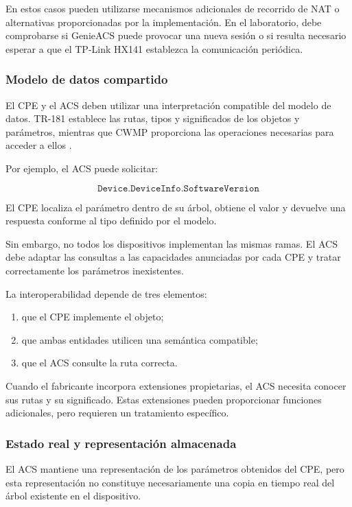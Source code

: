 En estos casos pueden utilizarse mecanismos adicionales de recorrido de
NAT o alternativas proporcionadas por la implementación. En el
laboratorio, debe comprobarse si GenieACS puede provocar una nueva sesión
o si resulta necesario esperar a que el TP-Link HX141 establezca la
comunicación periódica.


\subsubsection*{Modelo de datos compartido}

El CPE y el ACS deben utilizar una interpretación compatible del modelo
de datos. TR-181 establece las rutas, tipos y significados de los objetos
y parámetros, mientras que CWMP proporciona las operaciones necesarias
para acceder a ellos \cite{bbf_tr181}.

Por ejemplo, el ACS puede solicitar:

\[
    \texttt{Device.DeviceInfo.SoftwareVersion}
\]

El CPE localiza el parámetro dentro de su árbol, obtiene el valor y
devuelve una respuesta conforme al tipo definido por el modelo.

Sin embargo, no todos los dispositivos implementan las mismas ramas. El
ACS debe adaptar las consultas a las capacidades anunciadas por cada CPE
y tratar correctamente los parámetros inexistentes.

La interoperabilidad depende de tres elementos:

\begin{enumerate}
    \item que el CPE implemente el objeto;

    \item que ambas entidades utilicen una semántica compatible;

    \item que el ACS consulte la ruta correcta.
\end{enumerate}

Cuando el fabricante incorpora extensiones propietarias, el ACS necesita
conocer sus rutas y su significado. Estas extensiones pueden proporcionar
funciones adicionales, pero requieren un tratamiento específico.


\subsubsection*{Estado real y representación almacenada}

El ACS mantiene una representación de los parámetros obtenidos del CPE,
pero esta representación no constituye necesariamente una copia en
tiempo real del árbol existente en el dispositivo.


